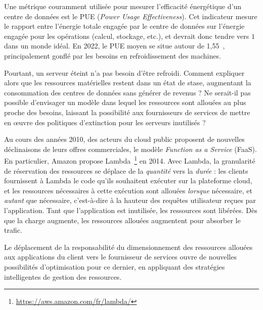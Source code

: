 Une métrique couramment utilisée pour mesurer l'efficacité énergétique d'un centre de données est le PUE (\textit{Power Usage Effectiveness}). Cet indicateur mesure le rapport entre l'énergie totale engagée par le centre de données sur l'énergie engagée pour les opérations (calcul, stockage, etc.), et devrait donc tendre vers $1$ dans un monde idéal. En 2022, le PUE moyen se situe autour de 1,55~\cite{davisUptimeInstituteGlobal2022}, principalement gonflé par les besoins en refroidissement des machines.

Pourtant, un serveur éteint n'a pas besoin d'être refroidi. Comment expliquer alors que les ressources matérielles restent dans un état de stase, augmentant la consommation des centres de données sans générer de revenus ? Ne serait-il pas possible d'envisager un modèle dans lequel les ressources sont allouées au plus proche des besoins, laissant la possibilité aux fournisseurs de services de mettre en œuvre des politiques d'extinction pour les serveurs inutilisés ?

Au cours des années 2010, des acteurs du cloud public proposent de nouvelles déclinaisons de leurs offres commerciales, le modèle \textit{Function as a Service} (FaaS). En particulier, Amazon propose Lambda~\footnote{\href{https://aws.amazon.com/fr/lambda/}{https://aws.amazon.com/fr/lambda/}} en 2014. Avec Lambda, la granularité de réservation des ressources se déplace de la \textit{quantité} vers la \textit{durée} : les clients fournissent à Lambda le code qu'ils souhaitent exécuter sur la plateforme cloud, et les ressources nécessaires à cette exécution sont allouées \textit{lorsque} nécessaire, et \textit{autant} que nécessaire, c'est-à-dire à la hauteur des requêtes utilisateur reçues par l'application. Tant que l'application est inutilisée, les ressources sont libérées. Dès que la charge augmente, les ressources allouées augmentent pour absorber le trafic.

Le déplacement de la responsabilité du dimensionnement des ressources allouées aux applications du client vers le fournisseur de services ouvre de nouvelles possibilités d'optimisation pour ce dernier, en appliquant des stratégies intelligentes de gestion des ressources.




